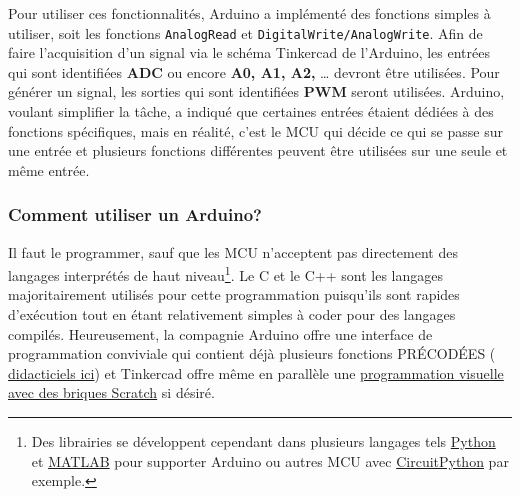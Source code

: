 \documentclass[english,french,12pt]{article}
\begin{document}
 Pour utiliser ces fonctionnalités, Arduino a implémenté des fonctions simples à utiliser, soit les fonctions \texttt{AnalogRead}  et \texttt{DigitalWrite/AnalogWrite}. Afin de faire l’acquisition d’un signal via le schéma Tinkercad de l’Arduino, les entrées qui sont identifiées \textbf{ADC} ou encore \textbf{A0, A1, A2,} … devront être utilisées. Pour générer un signal, les sorties qui sont identifiées \textbf{PWM} seront utilisées. Arduino, voulant simplifier la tâche, a indiqué que certaines entrées étaient dédiées à des fonctions spécifiques, mais en réalité, c’est le MCU qui décide ce qui se passe sur une entrée et plusieurs fonctions différentes peuvent être utilisées sur une seule et même entrée.
 
\subsubsection*{Comment utiliser un Arduino?}
Il faut le programmer, sauf que les MCU n'acceptent pas directement des langages interprétés de haut niveau\footnote{Des librairies se développent cependant dans plusieurs langages tels \href{https://pypi.org/project/pyserial/}{Python} et \href{https://www.mathworks.com/help/supportpkg/arduinoio/examples/getting-started-with-matlab-support-package-for-arduino-hardware.html}{MATLAB} pour supporter Arduino ou autres MCU avec \href{https://www.digikey.ca/en/maker/blogs/2018/python-on-hardware}{CircuitPython} par exemple.}. Le C et le C++ sont les langages majoritairement utilisés pour cette programmation puisqu’ils sont rapides d’exécution tout en étant relativement simples à coder pour des langages compilés. Heureusement, la compagnie Arduino offre une interface de programmation conviviale qui contient déjà plusieurs fonctions PRÉCODÉES (\href{https://www.arduino.cc/en/Tutorial/BuiltInExamples}{
didacticiels ici}) et Tinkercad offre même en parallèle une \href{https://scientiffic.medium.com/tinkercad-circuits-code-blocks-9953d47b5a3f}{programmation visuelle avec des briques Scratch} si désiré. 
\end{document}
